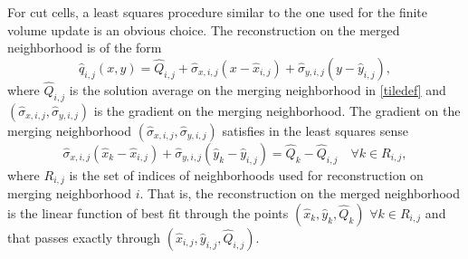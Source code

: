 \begin{enumerate}
\vspace*{.1in}
For cut cells, a least squares procedure  similar to the one used for
the finite volume update is an obvious choice. 
The reconstruction on the merged neighborhood is of the form
\begin{equation}
\widehat{q}_{i,j}(x,y) = \widehat{Q}_{i, j} + \widehat{\sigma}_{x,i,j}(x - \widehat{x}_{i,j}) + \widehat{\sigma}_{y,i,j}(y - \widehat{y}_{i,j}),
\end{equation}
where $\widehat{Q}_{i, j}$ is the solution average on the merging neighborhood in \eqref{tiledef} and $(\widehat{\sigma}_{x,i,j},\widehat{\sigma}_{y,i,j})$ is the gradient on the merging neighborhood.
The gradient on the merging neighborhood $(\widehat{\sigma}_{x,i,j},\widehat{\sigma}_{y,i,j})$ satisfies in the least squares sense
\begin{equation}\label{eq:linrecon}
\widehat{\sigma}_{x,i,j}(\widehat{x}_{k} - \widehat{x}_{i,j}) + \widehat{\sigma}_{y,i,j}(\widehat{y}_{k} - \widehat{y}_{i,j})= \widehat{Q}_{k} - \widehat{Q}_{i, j} \quad \forall k \in R_{i,j},
\end{equation}
where $R_{i,j}$ is the set of indices of neighborhoods used for reconstruction 
on merging neighborhood $i$.  That is, the reconstruction on the merged neighborhood is the linear function of best fit through the points $(\widehat x_k, \widehat y_k, \widehat Q_k)$ $\forall k \in R_{i,j}$ and that passes exactly through $(\widehat x_{i,j}, \widehat y_{i,j}, \widehat{Q}_{i,j})$.




\end{enumerate}
